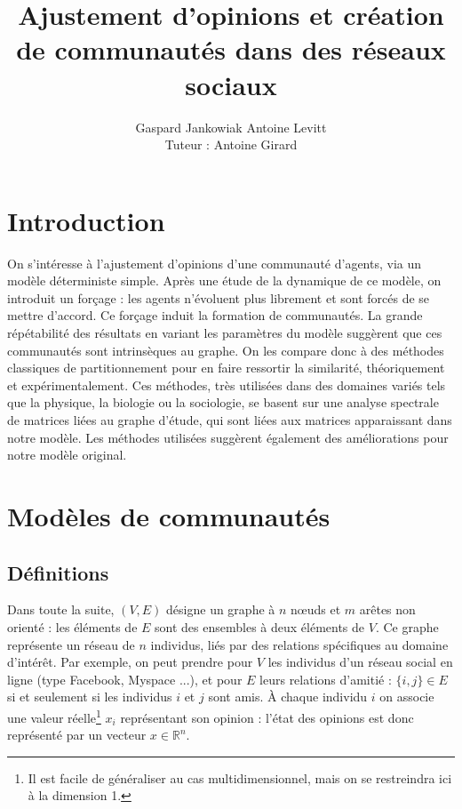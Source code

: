 \documentclass[12pt]{article}
\newcommand{\R}{\mathbb{R}}
\begin{document}
\author{Gaspard Jankowiak \quad Antoine Levitt\\ Tuteur : Antoine Girard}
\title{Ajustement d'opinions et création de communautés dans des réseaux sociaux}
\maketitle
{}
\thispagestyle{empty}
\newpage
\tableofcontents
\newpage

\section{Introduction}
On s'intéresse à l'ajustement d'opinions d'une communauté d'agents,
via un modèle déterministe simple. Après une étude de la dynamique de
ce modèle, on introduit un forçage : les agents n'évoluent plus
librement et sont forcés de se mettre d'accord. Ce forçage induit la
formation de communautés. La grande répétabilité des résultats en
variant les paramètres du modèle suggèrent que ces communautés sont
intrinsèques au graphe. On les compare donc à des méthodes classiques
de partitionnement pour en faire ressortir la similarité,
théoriquement et expérimentalement. Ces méthodes, très utilisées dans
des domaines variés tels que la physique, la biologie ou la
sociologie, se basent sur une analyse spectrale de matrices liées au
graphe d'étude, qui sont liées aux matrices apparaissant dans notre
modèle. Les méthodes utilisées suggèrent également des améliorations pour notre
modèle original.

\section{Modèles de communautés}
\subsection{Définitions}
Dans toute la suite, $(V, E)$ désigne un graphe à $n$ n\oe uds et $m$
arêtes non orienté : les éléments de $E$ sont des ensembles à deux
éléments de $V$. Ce graphe représente un réseau de $n$ individus, liés
par des relations spécifiques au domaine d'intérêt. Par exemple, on
peut prendre pour $V$ les individus d'un réseau social en ligne (type
Facebook, Myspace ...), et pour $E$ leurs relations d'amitié : $\{i,
j\} \in E$ si et seulement si les individus $i$ et $j$ sont amis. À
chaque individu $i$ on associe une valeur réelle\footnote{Il est facile
de généraliser au cas multidimensionnel, mais on se restreindra ici à la
dimension 1.} $x_i$ représentant son opinion : l'état des opinions est
donc représenté par un vecteur $x \in \R^n$.
\end{document}
